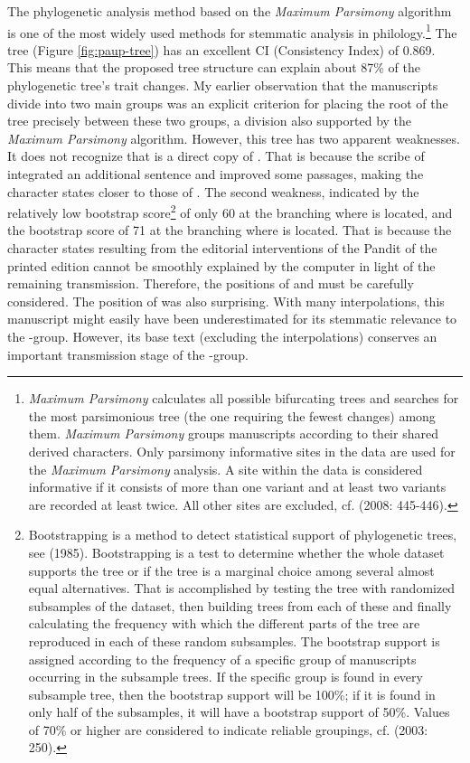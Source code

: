 The phylogenetic analysis method based on the \textit{Maximum Parsimony} algorithm is one of the most widely used methods for stemmatic analysis in philology.\footnote{\textit{Maximum Parsimony} calculates all possible bifurcating trees and searches for the most parsimonious tree (the one requiring the fewest changes) among them. \textit{Maximum Parsimony} groups manuscripts according to their shared derived characters. Only parsimony informative sites in the data are used for the \textit{Maximum Parsimony} analysis. A site within the data is considered informative if it consists of more than one variant and at least two variants are recorded at least twice. All other sites are excluded, cf. \citeauthor{windram2008} (2008: 445-446).} The tree (Figure \ref{fig:paup-tree}) has an excellent CI (Consistency Index) of 0.869. This means that the proposed tree structure can explain about 87\% of the phylogenetic tree's trait changes. My earlier observation that the manuscripts divide into two main groups was an explicit criterion for placing the root of the tree precisely between these two groups, a division also supported by the \textit{Maximum Parsimony} algorithm. However, this tree has two apparent weaknesses. It does not recognize that  is a direct copy of . That is because the scribe of  integrated an additional sentence and improved some passages, making the character states closer to those of . The second weakness, indicated by the relatively low bootstrap score\footnote{Bootstrapping is a method to detect statistical support of phylogenetic trees, see \citeauthor{felsenstein1985} (1985). Bootstrapping is a test to determine whether the whole dataset supports the tree or if the tree is a marginal choice among several almost equal alternatives. That is accomplished by testing the tree with randomized subsamples of the dataset, then building trees from each of these and finally calculating the frequency with which the different parts of the tree are reproduced in each of these random subsamples. The bootstrap support is assigned according to the frequency of a specific group of manuscripts occurring in the subsample trees. If the specific group is found in every subsample tree, then the bootstrap support will be 100\%; if it is found in only half of the subsamples, it will have a bootstrap support of 50\%. Values of 70\% or higher are considered to indicate reliable groupings, cf. \citeauthor{sandra2003} (2003: 250).} of only 60 at the branching where  is located, and the bootstrap score of 71 at the branching where  is located. That is because the character states resulting from the editorial interventions of the Pandit of the printed edition cannot be smoothly explained by the computer in light of the remaining transmission. Therefore, the positions of  and  must be carefully considered. The position of  was also surprising. With many interpolations, this manuscript might easily have been underestimated for its stemmatic relevance to the \beta-group. However, its base text (excluding the interpolations) conserves an important transmission stage of the \beta-group.

